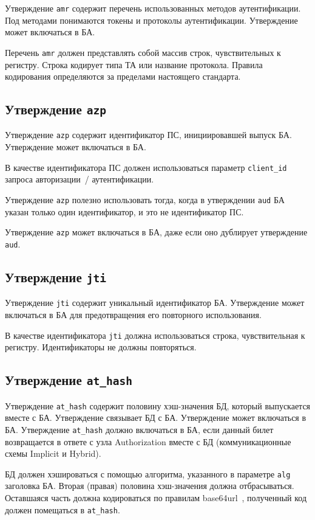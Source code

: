 Утверждение \lstinline{amr} содержит перечень использованных методов
аутентификации. Под методами понимаются токены и протоколы аутентификации.
%
Утверждение может включаться в БА.

Перечень \lstinline{amr} должен представлять собой массив строк,
чувствительных к регистру. Строка кодирует типа ТА или название протокола.
%
Правила кодирования определяются за пределами настоящего стандарта.

\subsection{Утверждение \lstinline{azp}}\label{CLAIMS.Azp}

Утверждение \lstinline{azp} содержит идентификатор ПС, инициировавшей выпуск 
БА. Утверждение может включаться в БА.

В качестве идентификатора ПС должен использоваться параметр 
\lstinline{client_id} запроса авторизации~/ аутентификации.

Утверждение \lstinline{azp} полезно использовать тогда, когда 
в утверждении \lstinline{aud} БА указан только один идентификатор,
и это не идентификатор ПС.

Утверждение \lstinline{azp} может включаться в БА, даже если оно дублирует 
утверждение \lstinline{aud}.


\subsection{Утверждение \lstinline{jti}}\label{CLAIMS.Jti}

Утверждение \lstinline{jti} содержит уникальный идентификатор БА.
Утверждение может включаться в БА для предотвращения его повторного использования.

В качестве идентификатора \lstinline{jti} должна использоваться строка, 
чувствительная к регистру. Идентификаторы не должны повторяться.

\subsection{Утверждение \lstinline{at_hash}}\label{CLAIMS.AtHash}

Утверждение \lstinline{at_hash} содержит половину хэш-значения БД, который 
выпускается вместе с БА. Утверждение связывает БД с БА. Утверждение может 
включаться в БА.
%
Утверждение \lstinline{at_hash} должно включаться в БА, если данный билет 
возвращается в ответе с узла Authorization вместе с БД (коммуникационные 
схемы Implicit и Hybrid).

БД должен хэшироваться с помощью алгоритма, указанного в параметре
\lstinline{alg} заголовка БА. Вторая (правая) половина хэш-значения 
должна отбрасываться. Оставшаяся часть должна кодироваться по правилам 
base64url~\cite{RFC4648}, полученный код должен помещаться в 
\lstinline{at_hash}.
   




